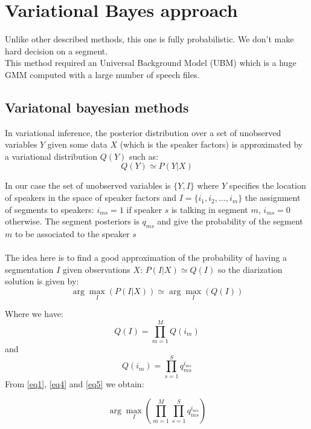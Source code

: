 \documentclass{techrep} %
\begin{document}
\section{Variational Bayes approach}

Unlike other described methods, this one is fully probabilistic. We
don't make hard decision on a segment.\\ This method required an
Universal Background Model (UBM) which is a huge GMM computed with a
large number of speech files.

\subsection{Variatonal bayesian methods}

In variational inference, the posterior distribution over a set of
unobserved variables $Y$ given some data $X$ (which is the speaker
factors) is approximated by a variational distribution $Q(Y)$ such as:
$$Q(Y) \simeq P(Y|X) $$

In our case the set of unobserved variables is $\{Y,I\}$ where $Y$
specifies the location of speakers in the space of speaker factors and
$I = \{i_1, i_2, ..., i_m\}$ the assignment of segments to speakers:
$i_{ms} = 1$ if speaker $s$ is talking in segment $m$, $i_{ms} = 0$
otherwise.  The segment posteriors is $q_{ms}$ and give the
probability of the segment $m$ to be associated to the speaker $s$\\\\


The idea here is to find a good approximation of the probability of
having a segmentation $I$ given observations $X$: $P(I|X) \simeq Q(I)$
so the diarization solution is given by:
\begin{equation}\label{eq1}
  \arg\max_{I}(P(I|X)) \simeq \arg\max_{I}(Q(I))
\end{equation}

Where we have:
\begin{equation}\label{eq4}
  Q(I) = \prod_{m=1}^{M}Q(i_m)
\end{equation}
and
\begin{equation}\label{eq5}
  Q(i_m) = \prod_{s=1}^{S}q_{ms}^{i_{ms}}
\end{equation}
From \eqref{eq1}, \eqref{eq4} and \eqref{eq5} we obtain:

\begin{equation}\label{eq3}
  \arg\max_{I}(\prod_{m=1}^{M}{\prod_{s=1}^{S}{q_{ms}^{i_{ms}}}})
\end{equation}
\end{document}
